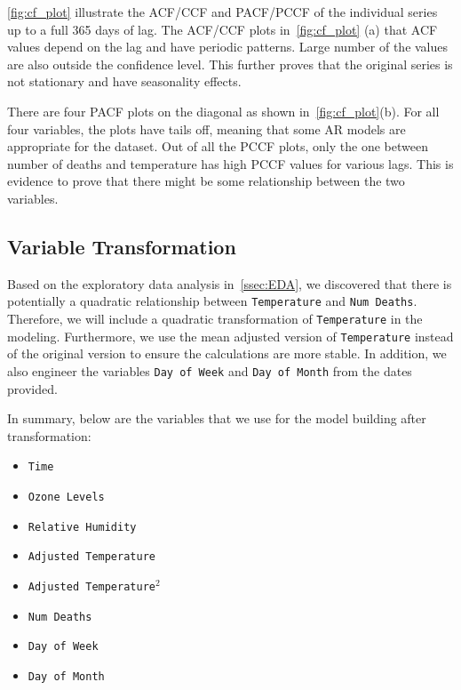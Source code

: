 \documentclass{article}\usepackage[]{graphicx}\usepackage[]{color}
\begin{document}
\begin{landscape}
\autoref{fig:cf_plot} illustrate the ACF/CCF and PACF/PCCF of the individual series up to a full 365 days of lag. The ACF/CCF plots in~\autoref{fig:cf_plot} (a) that ACF values depend on the lag and have periodic patterns. Large number of the values are also outside the confidence level. This further proves that the original series is not stationary and have seasonality effects. 

There are four PACF plots on the diagonal as shown in~\autoref{fig:cf_plot}(b). For all four variables, the plots have tails off, meaning that some AR models are appropriate for the dataset. Out of all the PCCF plots, only the one between number of deaths and temperature has high PCCF values for various lags. This is evidence to prove that there might be some relationship between the two variables.
\end{landscape}

\subsection{Variable Transformation}

Based on the exploratory data analysis in~\autoref{ssec:EDA}, we discovered that there is potentially a quadratic relationship between \texttt{Temperature} and \texttt{Num Deaths}. Therefore, we will include a quadratic transformation of \texttt{Temperature} in the modeling. Furthermore, we use the mean adjusted version of \texttt{Temperature} instead of the original version to ensure the calculations are more stable. In addition, we also engineer the variables \texttt{Day of Week} and \texttt{Day of Month} from the dates provided.

In summary, below are the variables that we use for the model building after transformation:
\begin{itemize}
    \item \texttt{Time}
    \item \texttt{Ozone Levels}
    \item \texttt{Relative Humidity}
    \item \texttt{Adjusted Temperature}
    \item \texttt{Adjusted Temperature}$^2$
    \item \texttt{Num Deaths}
    \item \texttt{Day of Week}
    \item \texttt{Day of Month}
\end{itemize}
\end{document}
